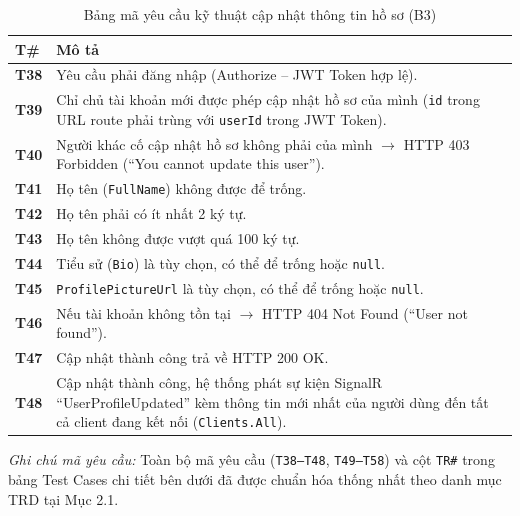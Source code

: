 \documentclass[11pt,a4paper]{article}
\begin{document}
\begin{table}[H]
\centering
\small
\begin{tabularx}{\textwidth}{|C{1.5cm}|X|}
\hline
{}
\textbf{T\#} & \textbf{Mô tả} \tabularnewline
\hline
\textbf{T38} & Yêu cầu phải đăng nhập (Authorize -- JWT Token hợp lệ). \\ \hline
\textbf{T39} & Chỉ chủ tài khoản mới được phép cập nhật hồ sơ của mình (\texttt{id} trong URL route phải trùng với \texttt{userId} trong JWT Token). \\ \hline
\textbf{T40} & Người khác cố cập nhật hồ sơ không phải của mình $\rightarrow$ HTTP 403 Forbidden (``You cannot update this user''). \\ \hline
\textbf{T41} & Họ tên (\texttt{FullName}) không được để trống. \\ \hline
\textbf{T42} & Họ tên phải có ít nhất 2 ký tự. \\ \hline
\textbf{T43} & Họ tên không được vượt quá 100 ký tự. \\ \hline
\textbf{T44} & Tiểu sử (\texttt{Bio}) là tùy chọn, có thể để trống hoặc \texttt{null}. \\ \hline
\textbf{T45} & \texttt{ProfilePictureUrl} là tùy chọn, có thể để trống hoặc \texttt{null}. \\ \hline
\textbf{T46} & Nếu tài khoản không tồn tại $\rightarrow$ HTTP 404 Not Found (``User not found''). \\ \hline
\textbf{T47} & Cập nhật thành công trả về HTTP 200 OK. \\ \hline
\textbf{T48} & Cập nhật thành công, hệ thống phát sự kiện SignalR ``UserProfileUpdated'' kèm thông tin mới nhất của người dùng đến tất cả client đang kết nối (\texttt{Clients.All}). \\ \hline
\end{tabularx}
\caption{Bảng mã yêu cầu kỹ thuật cập nhật thông tin hồ sơ (B3)}
\end{table}

\noindent\textit{Ghi chú mã yêu cầu:} Toàn bộ mã yêu cầu (\texttt{T38--T48}, \texttt{T49--T58}) và cột \texttt{TR\#} trong bảng Test Cases chi tiết bên dưới đã được chuẩn hóa thống nhất theo danh mục TRD tại Mục 2.1.
\end{document}
